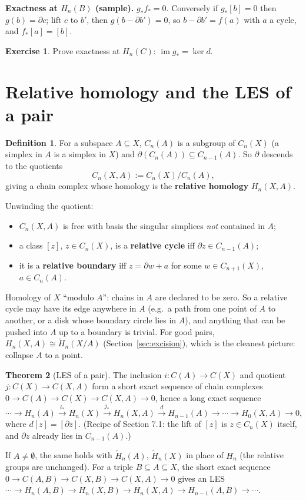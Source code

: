 \documentclass[11pt]{article}
\newcommand{\im}{\operatorname{im}}
\newcommand{\Hred}{\tilde H}
\theoremstyle{definition}
\newtheorem{thm}{Theorem}[section]
\newtheorem{defn}[thm]{Definition}
\newtheorem{exercise}{Exercise}[section]
\begin{document}
\textbf{Exactness at $H_n(B)$ (sample).} $g_*f_*=0$. Conversely if $g_*[b]=0$ then $g(b)=\partial c$; lift $c$ to $b'$, then $g(b-\partial b')=0$, so $b-\partial b'=f(a)$ with $a$ a cycle, and $f_*[a]=[b]$.

\begin{exercise}\label{exr:exact}
Prove exactness at $H_n(C)$: $\im g_*=\ker d$.
\end{exercise}

\section{Relative homology and the LES of a pair}

\begin{defn}
For a subspace $A\subseteq X$, $C_n(A)$ is a subgroup of $C_n(X)$ (a simplex in $A$ is a simplex in $X$) and $\partial(C_n(A))\subseteq C_{n-1}(A)$. So $\partial$ descends to the quotients
\[C_n(X,A):=C_n(X)/C_n(A),\]
giving a chain complex whose homology is the \textbf{relative homology} $H_n(X,A)$.
\end{defn}
Unwinding the quotient:
\begin{itemize}
\item $C_n(X,A)$ is free with basis the singular simplices \emph{not} contained in $A$;
\item a class $[z]$, $z\in C_n(X)$, is a \textbf{relative cycle} iff $\partial z\in C_{n-1}(A)$;
\item it is a \textbf{relative boundary} iff $z=\partial w+a$ for some $w\in C_{n+1}(X)$, $a\in C_n(A)$.
\end{itemize}
\begin{intuition}
Homology of $X$ ``modulo $A$'': chains in $A$ are declared to be zero. So a relative cycle may have its edge anywhere in $A$ (e.g.\ a path from one point of $A$ to another, or a disk whose boundary circle lies in $A$), and anything that can be pushed into $A$ up to a boundary is trivial. For good pairs, $H_n(X,A)\cong\Hred_n(X/A)$ (Section~\ref{sec:excision}), which is the cleanest picture: collapse $A$ to a point.
\end{intuition}

\begin{thm}[LES of a pair]
The inclusion $i:C(A)\to C(X)$ and quotient $j:C(X)\to C(X,A)$ form a short exact sequence of chain complexes $0\to C(A)\to C(X)\to C(X,A)\to0$, hence a long exact sequence
\[\cdots\to H_n(A)\xrightarrow{i_*}H_n(X)\xrightarrow{j_*}H_n(X,A)\xrightarrow{d}H_{n-1}(A)\to\cdots\to H_0(X,A)\to0,\]
where $d[z]=[\partial z]$. (Recipe of Section 7.1: the lift of $[z]$ is $z\in C_n(X)$ itself, and $\partial z$ already lies in $C_{n-1}(A)$.)

If $A\neq\emptyset$, the same holds with $\Hred_n(A)$, $\Hred_n(X)$ in place of $H_n$ (the relative groups are unchanged). For a triple $B\subseteq A\subseteq X$, the short exact sequence $0\to C(A,B)\to C(X,B)\to C(X,A)\to0$ gives an LES
$\cdots\to H_n(A,B)\to H_n(X,B)\to H_n(X,A)\to H_{n-1}(A,B)\to\cdots$.
\end{thm}
\end{document}
